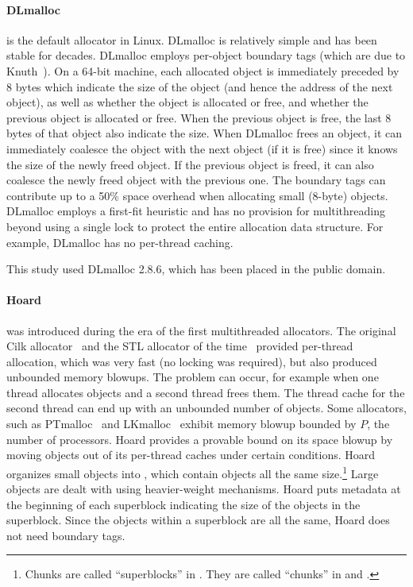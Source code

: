 \documentclass[natbib,sort&compress,10pt]{sigplanconf}
\begin{document}
{\paragraph{DLmalloc}} \cite{Lea96} is the default allocator in Linux.
DLmalloc is relatively simple and has been stable for decades.
DLmalloc employs per-object boundary tags (which are due to
Knuth~\cite{Knuth73}).  On a 64-bit machine, each allocated object is
immediately preceded by 8 bytes which indicate the size of the object
(and hence the address of the next object), as well as whether the
object is allocated or free, and whether the previous object is
allocated or free.  When the previous object is free, the last 8 bytes
of that object also indicate the size.  When DLmalloc frees an object,
it can immediately coalesce the object with the next object (if it is
free) since it knows the size of the newly freed object.  If the
previous object is freed, it can also coalesce the newly freed object
with the previous one.  The boundary tags can contribute up to a 50\%
space overhead when allocating small (8-byte) objects.  DLmalloc
employs a first-fit heuristic and has no provision for multithreading
beyond using a single lock to protect the entire allocation data
structure.  For example, DLmalloc has no per-thread caching.

This study used DLmalloc 2.8.6, which has been placed in the public domain.

{\paragraph{Hoard}} \cite{BergerMcBl00} was introduced during the era
of the first multithreaded allocators.  The original Cilk
allocator~\cite{BlumofeLe94} and the STL allocator of the
time~\cite{SGI97} provided per-thread allocation, which was very fast
(no locking was required), but also produced unbounded memory blowups.
The problem can occur, for example when one thread allocates objects
and a second thread frees them.  The thread cache for the second
thread can end up with an unbounded number of objects.  Some
allocators, such as PTmalloc~\cite{Gloger06} and
LKmalloc~\cite{LarsonKr98} exhibit memory blowup bounded by $P$, the
number of processors.  Hoard provides a provable bound on its space
blowup by moving objects out of its per-thread caches under certain
conditions.  Hoard organizes small objects into , which
contain objects all the same size.\footnote{Chunks are called
  ``superblocks'' in \cite{BergerMcBl00}.  They are called ``chunks''
  in \cite{Evans06} and \cite{KukanovVo07}.}  Large objects are dealt
with using heavier-weight mechanisms.  Hoard puts metadata at the
beginning of each superblock indicating the size of the objects in the
superblock.  Since the objects within a superblock are all the same,
Hoard does not need boundary tags.
\end{document}

